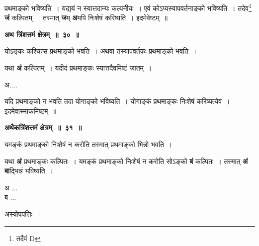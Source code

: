 \documentclass[11pt, openany]{book}
\begin{document}
\noindent प्रथमाङ्को भविष्यति~। यद्ययं न स्यात्तदान्यः कल्पनीयः~। एवं कोऽप्यस्यापवर्तनाङ्को भविष्यति~। तदेव\renewcommand{\thefootnote}{१}\footnote{तदैवं {\en D}} \textbf{जं} कल्पितम्~। तस्मात् \textbf{ज}म् \textbf{अ}मपि निःशेषं करिष्यति~। इदमेवेष्टम्~॥ 
\vspace{-1mm}

\begin{center}
\textbf{\large अथ त्रिंशत्तमं क्षेत्रम्~॥~३०~॥}
\end{center}

{\ab योऽङ्कः कश्चित्स प्रथमाङ्को भवति~। अथवा तस्यापवर्तकः प्रथमाङ्को भवति~। }

\begin{flushleft}
\begin{minipage}[t]{0.75\textwidth}
\hspace{4mm} यथा \textbf{अं} कल्पितम्~। यदीदं प्रथमाङ्कः स्यात्तदैवमिष्टं जातम्~।
\end{minipage} 
\hfill
\begin{minipage}[t]{0.15\textwidth}
अ....
\end{minipage}
\end{flushleft}
\vspace{-3mm}

\noindent यदि प्रथमाङ्को न भवति तदा योगाङ्को भविष्यति~। योगाङ्कं प्रथमाङ्कः निःशेषं करिष्यत्येव~। इदमेवास्माकमिष्टम्~॥ 
\vspace{2mm}

\begin{center}
\textbf{\large अथैकत्रिंशत्तमं क्षेत्रम्~॥~३१~॥}
\end{center}

{\ab यमङ्कं प्रथमाङ्को निःशेषं न करोति तस्मात् प्रथमाङ्को भिन्नो भवति~। }

\begin{flushleft}
\begin{minipage}[t]{0.75\textwidth}
\hspace{4mm} यथा \textbf{अं} प्रथमाङ्कः कल्पितः~। यमङ्कं प्रथमाङ्को निःशेषं न करोति सोऽङ्को \textbf{बं} कल्पितः~। तस्मात् \textbf{अं बा}द्भिन्नं भविष्यति~।
\end{minipage} 
\hfill
\begin{minipage}[t]{0.15\textwidth}
अ ...\\
ब ...
\end{minipage}
\end{flushleft}

\newpage
\begin{center}
अस्योपपत्तिः~।
\end{center}
\end{document}
